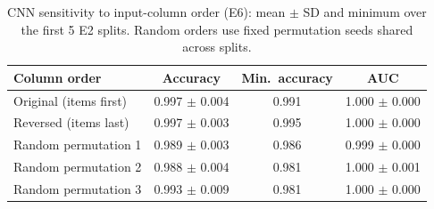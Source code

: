 \begin{table}[t]
\centering
\caption{CNN sensitivity to input-column order (E6): mean $\pm$ SD and minimum over the first 5 E2 splits. Random orders use fixed permutation seeds shared across splits.}
\label{tab:order}
\footnotesize
\setlength{\tabcolsep}{4pt}
\begin{tabular}{lccc}
\toprule
Column order & Accuracy & Min.\ accuracy & AUC \\
\midrule
Original (items first) & 0.997 $\pm$ 0.004 & 0.991 & 1.000 $\pm$ 0.000 \\
Reversed (items last) & 0.997 $\pm$ 0.003 & 0.995 & 1.000 $\pm$ 0.000 \\
Random permutation 1 & 0.989 $\pm$ 0.003 & 0.986 & 0.999 $\pm$ 0.000 \\
Random permutation 2 & 0.988 $\pm$ 0.004 & 0.981 & 1.000 $\pm$ 0.001 \\
Random permutation 3 & 0.993 $\pm$ 0.009 & 0.981 & 1.000 $\pm$ 0.000 \\
\bottomrule
\end{tabular}
\end{table}